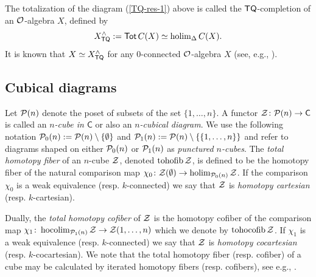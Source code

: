 \begin{remark} \label{TQ-completion} The totalization of the diagram (\ref{TQ-res-1}) above is called the $\mathsf{TQ}$-completion of an $\mathcal{O}$-algebra $X$, defined by \[X_{\mathsf{TQ}}^{\wedge}:=\operatorname{\mathsf{Tot}} C(X) \simeq \operatorname{holim}_{\Delta} C(X).\]
It is known that $X\simeq X_{\mathsf{TQ}}^{\wedge}$ for any $0$-connected $\mathcal{O}$-algebra $X$ (see, e.g., \cite{Ching-Harper-BM}).
\end{remark}  


\subsection{Cubical diagrams} \label{sec:cubical-diags}
Let $\mathcal{P}(n)$ denote the poset of subsets of the set $\{1,\dots,n\}$. A functor $\mathcal{Z}\colon \mathcal{P}(n)\to \mathsf{C}$ is called an \textit{$n$-cube in $\mathsf{C}$} or also an \textit{$n$-cubical diagram}. We use the following notation $\mathcal{P}_0(n):=\mathcal{P}(n)\setminus \{\emptyset\}$ and $ \mathcal{P}_1(n):=\mathcal{P}(n)\setminus \{\{1,\dots,n\}\}$ and refer to diagrams shaped on either $\mathcal{P}_0(n)$ or $\mathcal{P}_1(n)$ as \textit{punctured $n$-cubes}. The \textit{total homotopy fiber} of an $n$-cube $\mathcal{Z}$, denoted $\operatorname{tohofib} \mathcal{Z}$, is defined to be the homotopy fiber of the natural comparison map $\chi_0\colon \mathcal{Z}(\emptyset)\to \operatorname{holim}_{\mathcal{P}_0(n)} \mathcal{Z}$. If the comparison $\chi_0$ is a weak equivalence (resp. $k$-connected) we say that $\mathcal{Z}$ is \textit{homotopy cartesian} (resp. $k$-cartesian). 

Dually, the \textit{total homotopy cofiber} of $\mathcal{Z}$ is the homotopy cofiber of the comparison map $\chi_1\colon\operatorname{hocolim}_{\mathcal{P}_1(n)} \mathcal{Z} \to \mathcal{Z}(1,\dots,n)$ which we denote by $\operatorname{tohocofib} \mathcal{Z}$. If $\chi_1$ is a weak equivalence (resp. $k$-connected) we say that $\mathcal{Z}$ is \textit{homotopy cocartesian} (resp. $k$-cocartesian). We note that the total homotopy fiber (resp. cofiber) of a cube may be calculated by iterated homotopy fibers (resp. cofibers), see e.g.,  \cite[3.2]{BJM-cross}.

